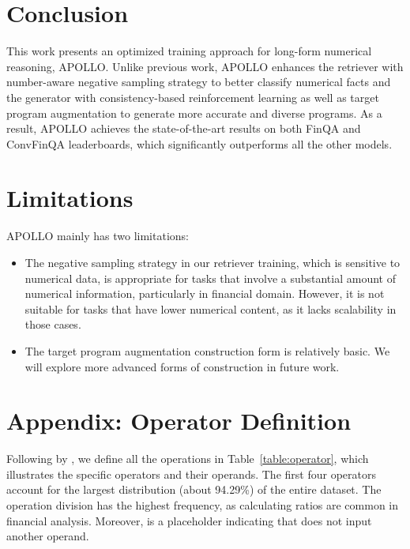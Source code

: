 \documentclass[11pt]{article}
\begin{document}
\section{Conclusion}
This work presents an optimized training approach for long-form numerical reasoning, APOLLO. Unlike previous work, APOLLO enhances the retriever with number-aware negative sampling strategy to better classify numerical facts and the generator with consistency-based reinforcement learning as well as target program augmentation to generate more accurate and diverse programs. As a result, APOLLO achieves the state-of-the-art results on both FinQA and ConvFinQA leaderboards, which significantly outperforms all the other models.


\section*{Limitations}
APOLLO mainly has two limitations:
\begin{itemize}
\item The negative sampling strategy in our retriever training, which is sensitive to numerical data, is appropriate for tasks that involve a substantial amount of numerical information, particularly in financial domain. However, it is not suitable for tasks that have lower numerical content, as it lacks scalability in those cases.
\item The target program augmentation construction form is relatively basic. We will explore more advanced forms of construction in future work.
    

\end{itemize}





\newpage

\appendix

\section{Appendix: Operator Definition}
\label{appendix:operator_definition}
Following by \citet{chen2021finqa}, we define all the operations in Table~\ref{table:operator}, which illustrates the specific operators and their operands.
The first four operators account for the largest distribution (about 94.29\%) of the entire dataset. The operation division has the highest frequency, as calculating ratios are common in financial analysis. Moreover,  is a placeholder indicating that does not input another operand.
\end{document}
